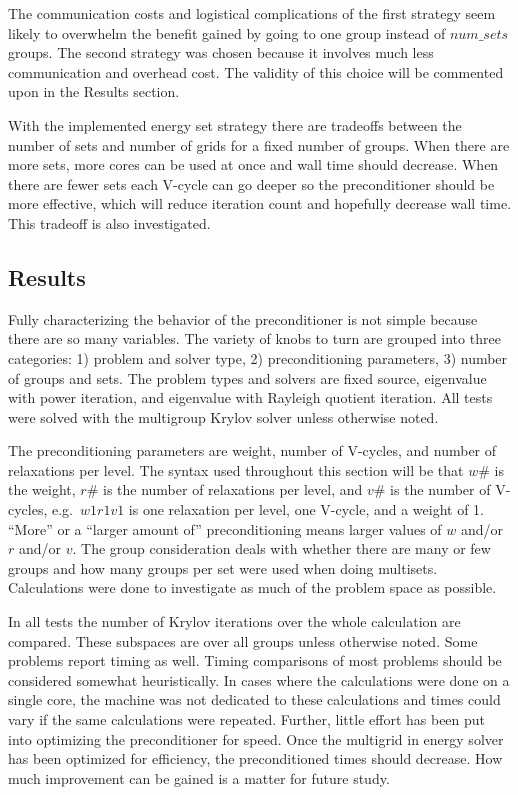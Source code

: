 The communication costs and logistical complications of the first strategy seem likely to overwhelm the benefit gained by going to one group instead of $num\_sets$ groups. The second strategy was chosen because it involves much less communication and overhead cost. The validity of this choice will be commented upon in the Results section. 

With the implemented energy set strategy there are tradeoffs between the number of sets and number of grids for a fixed number of groups. When there are more sets, more cores can be used at once and wall time should decrease. When there are fewer sets each V-cycle can go deeper so the preconditioner should be more effective, which will reduce iteration count and hopefully decrease wall time. This tradeoff is also investigated.

\subsection{Results}
Fully characterizing the behavior of the preconditioner is not simple because there are so many variables. The variety of knobs to turn are grouped into three categories: 1) problem and solver type, 2) preconditioning parameters, 3) number of groups and sets. The problem types and solvers are fixed source, eigenvalue with power iteration, and eigenvalue with Rayleigh quotient iteration. All tests were solved with the multigroup Krylov solver unless otherwise noted. 

The preconditioning parameters are weight, number of V-cycles, and number of relaxations per level. The syntax used throughout this section will be that $w\#$ is the weight, $r\#$ is the number of relaxations per level, and $v\#$ is the number of V-cycles, e.g.\ $w1r1v1$ is one relaxation per level, one V-cycle, and a weight of 1. ``More'' or a ``larger amount of'' preconditioning means larger values of $w$ and/or $r$ and/or $v$. The group consideration deals with whether there are many or few groups and how many groups per set were used when doing multisets. Calculations were done to investigate as much of the problem space as possible.

In all tests the number of Krylov iterations over the whole calculation are compared. These subspaces are over all groups unless otherwise noted. Some problems report timing as well. Timing comparisons of most problems should be considered somewhat heuristically. In cases where the calculations were done on a single core, the machine was not dedicated to these calculations and times could vary if the same calculations were repeated. Further, little effort has been put into optimizing the preconditioner for speed. Once the multigrid in energy solver has been optimized for efficiency, the preconditioned times should decrease. How much improvement can be gained is a matter for future study. 

